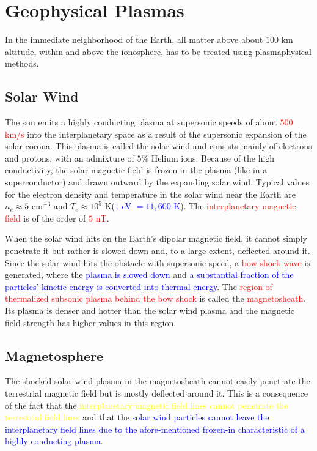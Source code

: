 \documentclass[12pt,a4paper]{article}
\begin{document}
\section{Geophysical Plasmas}
\cite{1996bspp.book.....B}  In the immediate neighborhood of the Earth, all matter above about $100$ km altitude, within and above the ionosphere, has to be treated using plasmaphysical methods. 

\subsection{Solar Wind}
\cite{1996bspp.book.....B} The sun emits a highly conducting plasma at supersonic speeds of about \textcolor{red}{$500$ km/s} into the interplanetary space as a result of the supersonic expansion of the solar corona. This plasma is called the solar wind and consists mainly of electrons and protons, with an admixture of $5\%$ Helium ions. Because of the high conductivity, the solar magnetic field is frozen in the plasma (like in a superconductor) and drawn outward by the expanding solar wind. Typical values for the electron density and temperature in the solar wind near the Earth are $n_e \approx 5$ cm$^{-3}$ and $T_e \approx 10^5$ K(\textcolor{blue}{$1$ eV $= 11,600$ K}). The \textcolor{red}{interplanetary magnetic field} is of the order of \textcolor{red}{$5$ nT}.

When the solar wind hits on the Earth's dipolar magnetic field, it cannot simply penetrate it but rather is slowed down and, to a large extent, deflected around it. Since the solar wind hits the obstacle with supersonic speed, a \textcolor{red}{bow shock wave} is generated, where the \textcolor{blue}{plasma is slowed down} and \textcolor{blue}{a substantial fraction of the particles' kinetic energy is converted into thermal energy}. The \textcolor{red}{region of thermalized subsonic plasma behind the bow shock} is called the \textcolor{red}{magnetosheath}. Its plasma is denser and hotter than the solar wind plasma and the magnetic field strength has higher values in this region. 


\subsection{Magnetosphere}
\cite{1996bspp.book.....B} The shocked solar wind plasma in the magnetosheath cannot easily penetrate the terrestrial magnetic field but is mostly deflected around it. This is a consequence of the fact that the \textcolor{yellow}{interplanetary magnetic field lines cannot penetrate the terrestrial field lines} and that the \textcolor{blue}{solar wind particles cannot leave the interplanetary field lines due to the afore-mentioned frozen-in characteristic of a highly conducting plasma}.
\end{document}
